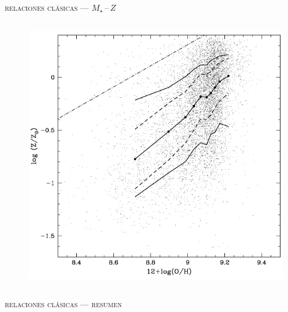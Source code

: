\documentclass[xcolor=dvipsnames,4pt,hyperref={colorlinks,citecolor=black,linkcolor=black,urlcolor=black}]{beamer}
\begin{document}
\begin{frame}{\textsc{relaciones clásicas --- $M_\star\,$--$\,Z$}}
\begin{columns}
\begin{figure}
\includegraphics[scale=0.6]{img/gallazzi2005-9}
\end{figure}

\end{columns}
\end{frame}

\begin{frame}{\textsc{relaciones clásicas --- resumen}}
\end{frame}
\end{document}
